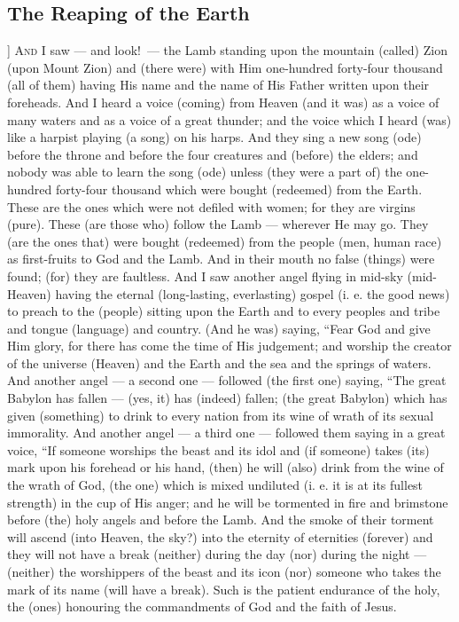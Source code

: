\begin{pages}
\begin{Leftside}
        			\chapter{The Reaping of the Earth}
				]		
		\renewcommand{\LettrineFontHook}{\Zallmanfamily}
		\lettrine[lines=3]{A}{nd} I saw — and look! — the Lamb standing upon the mountain (called) Zion (upon Mount Zion) and (there were) with Him one-hundred forty-four thousand (all of them) having His name and the name of His Father written upon their foreheads. And I heard a voice (coming) from Heaven (and it was) as a voice of many waters and as a voice of a great thunder; and the voice which I heard (was) like a harpist playing (a song) on his harps.  
		\pend
		\pstart
		And they sing a new song (ode) before the throne and before the four creatures and (before) the elders; and nobody was able to learn the song (ode) unless (they were a part of) the one-hundred forty-four thousand which were bought (redeemed) from the Earth. These are the ones which were not defiled with women; for they are virgins (pure). These (are those who) follow the Lamb — wherever He may go. They (are the ones that) were bought (redeemed) from the people (men, human race) as first-fruits to God and the Lamb. And in their mouth no false (things) were found; (for) they are faultless. 
		\pend
		\pstart
		And I saw another angel flying in mid-sky (mid-Heaven) having the eternal (long-lasting, everlasting) gospel (i. e. the good news) to preach to the (people) sitting upon the Earth and to every peoples and tribe and tongue (language) and country. (And he was) saying, “Fear God and give Him glory, for there has come the time of His judgement; and worship the creator of the universe (Heaven) and the Earth and the sea and the springs of waters. 
		\pend
		\pstart
		And another angel — a second one — followed (the first one) saying, “The great Babylon has fallen — (yes, it) has (indeed) fallen; (the great Babylon) which has given (something) to drink to every nation from its wine of wrath of its sexual immorality. 
		\pend
		\pstart
		And another angel — a third one — followed them saying in a great voice, “If someone worships the beast and its idol and (if someone) takes (its) mark upon his forehead or his hand, (then) he will (also) drink from the wine of the wrath of God, (the one) which is mixed undiluted (i. e. it is at its fullest strength) in the cup of His anger; and he will be tormented in fire and brimstone before (the) holy angels and before the Lamb. 
		\pend
		\pstart
		And the smoke of their torment will ascend (into Heaven, the sky?) into the eternity of eternities (forever) and they will not have a break (neither) during the day (nor) during the night — (neither) the worshippers of the beast and its icon (nor) someone who takes the mark of its name (will have a break). Such is the patient endurance of the holy, the (ones) honouring the commandments of God and the faith of Jesus. 

\end{Leftside}
\end{pages}
